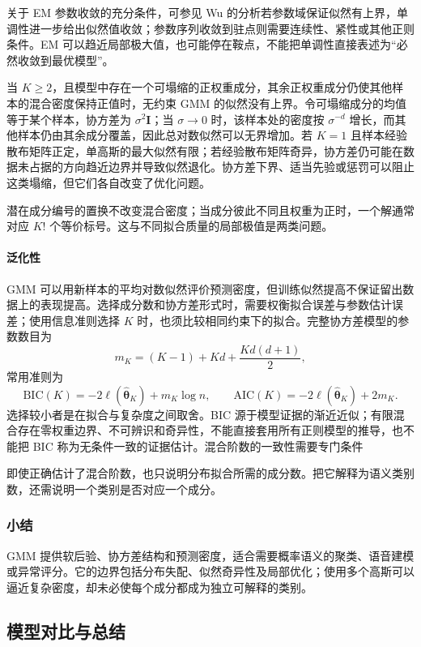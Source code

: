 关于 EM 参数收敛的充分条件，可参见 Wu 的分析若参数域保证似然有上界，单调性进一步给出似然值收敛；参数序列收敛到驻点则需要连续性、紧性或其他正则条件。EM 可以趋近局部极大值，也可能停在鞍点，不能把单调性直接表述为“必然收敛到最优模型”。

当 $K\geq2$，且模型中存在一个可塌缩的正权重成分，其余正权重成分仍使其他样本的混合密度保持正值时，无约束 GMM 的似然没有上界。令可塌缩成分的均值等于某个样本，协方差为 $\sigma^2\bm{I}$；当 $\sigma\to0$ 时，该样本处的密度按 $\sigma^{-d}$ 增长，而其他样本仍由其余成分覆盖，因此总对数似然可以无界增加。若 $K=1$ 且样本经验散布矩阵正定，单高斯的最大似然有限；若经验散布矩阵奇异，协方差仍可能在数据未占据的方向趋近边界并导致似然退化。协方差下界、适当先验或惩罚可以阻止这类塌缩，但它们各自改变了优化问题。

潜在成分编号的置换不改变混合密度；当成分彼此不同且权重为正时，一个解通常对应 $K!$ 个等价标号。这与不同拟合质量的局部极值是两类问题。

\paragraph{泛化性}
GMM 可以用新样本的平均对数似然评价预测密度，但训练似然提高不保证留出数据上的表现提高。选择成分数和协方差形式时，需要权衡拟合误差与参数估计误差；使用信息准则选择 $K$ 时，也须比较相同约束下的拟合。完整协方差模型的参数数目为
\[
 m_K=(K-1)+Kd+\frac{Kd(d+1)}{2},
\]
常用准则为
\begin{equation}
 \mathrm{BIC}(K)=-2\ell(\hat{\bm{\theta}}_K)+m_K\log n,
 \qquad
 \mathrm{AIC}(K)=-2\ell(\hat{\bm{\theta}}_K)+2m_K.
 \label{eq:clustering-bic}
\end{equation}
选择较小者是在拟合与复杂度之间取舍。BIC 源于模型证据的渐近近似；有限混合存在零权重边界、不可辨识和奇异性，不能直接套用所有正则模型的推导，也不能把 BIC 称为无条件一致的证据估计。混合阶数的一致性需要专门条件

即使正确估计了混合阶数，也只说明分布拟合所需的成分数。把它解释为语义类别数，还需说明一个类别是否对应一个成分。

\subsubsection{小结}

GMM 提供软后验、协方差结构和预测密度，适合需要概率语义的聚类、语音建模或异常评分。它的边界包括分布失配、似然奇异性及局部优化；使用多个高斯可以逼近复杂密度，却未必使每个成分都成为独立可解释的类别。

\subsection{模型对比与总结}

